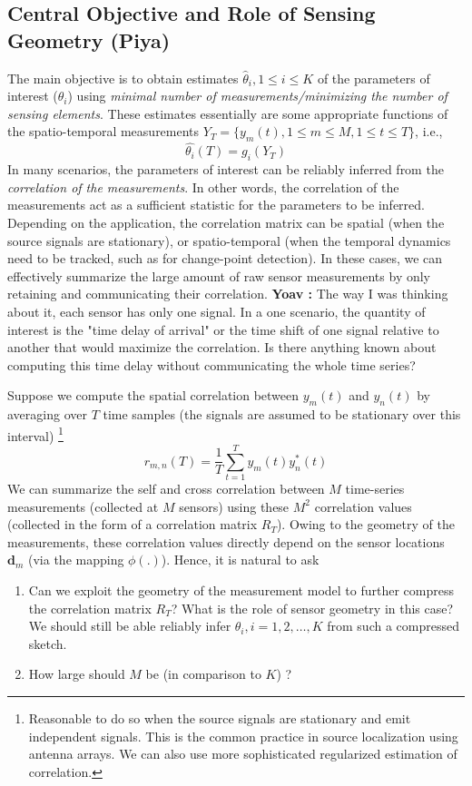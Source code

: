 \documentclass{article}
\newcommand{\comment}[3]{{\color{#1} {\bf #2 :} #3}}
\newcommand{\yoav}[1]{\comment{magenta}{Yoav}{#1}}
\begin{document}
\subsection{Central Objective and Role of Sensing Geometry (Piya)}
The main objective is to obtain estimates $\hat\theta_i, 1\leq i\leq K$ of the parameters of interest ($\theta_i$) using {\em minimal number of measurements/minimizing the number of sensing elements}. These estimates essentially are some appropriate functions of the spatio-temporal measurements $Y_T = \{y_m(t),  1\leq m\leq M, 1\leq t\leq T \}$, i.e., \begin{equation}
\hat{\theta_i}(T) = g_i (Y_T) 
\end{equation} 
In many scenarios, the parameters of interest can be reliably inferred from the {\em correlation of the measurements}. In other words, the correlation of the measurements act as a sufficient statistic for the parameters to be inferred. Depending on the application, the correlation matrix can be spatial (when the source signals are stationary), or spatio-temporal (when the temporal dynamics need to be tracked, such as for change-point detection). In these cases, we can effectively summarize the large amount of raw sensor measurements by only retaining and communicating their correlation. 
\yoav{The way I was thinking about it, each sensor has only one signal. In a one scenario, the quantity of interest is the "time delay of arrival" or the time shift of one signal relative to another that would maximize the correlation. Is there anything known about computing this time delay without communicating the whole time series?}

 Suppose we compute the spatial correlation between $y_m(t)$ and $y_n(t)$  by averaging over $T$ time samples (the signals are assumed to be stationary over this interval) \footnote{Reasonable to do so when the source signals are stationary and emit independent signals. This is the common practice in source localization using antenna arrays. We can also use more sophisticated regularized estimation of correlation.}
\begin{equation}
r_{m,n} (T) = \frac{1}{T}\sum_{t=1}^{T} y_m (t) y^*_n (t) 
\end{equation} 
We can summarize the self and cross correlation between $M$ time-series measurements (collected at $M$ sensors) using these $M^2$ correlation values (collected in the form of a correlation matrix $R_T$). Owing to the geometry of the measurements, these correlation values directly depend on the sensor locations $\mathbf{d}_m$  (via the mapping $\phi(.)$). Hence, it is natural to ask 
\begin{enumerate}
\item Can we exploit the geometry of the measurement model to further compress the  correlation matrix $R_T$? What is the role of sensor geometry in this case? We should still be able reliably infer $\theta_i, i=1,2,\ldots, K$ from such a compressed sketch.
\item How large should $M$ be (in comparison to $K$) ?
\end{enumerate}
\end{document}

